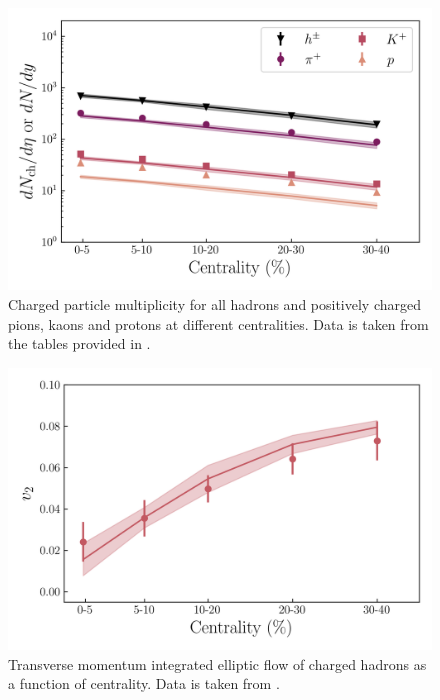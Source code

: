 \begin{figure}[H]
	\includegraphics[width=\textwidth]{images/dn_cent_bulk.png}
	\caption{\normalsize Charged particle multiplicity for all hadrons and positively charged pions, kaons and protons at different centralities. Data is taken from the tables provided in \cite{Abelev:2008ab}. } 
\end{figure}

\begin{figure}[H]
	\includegraphics[width=\textwidth]{images/vn_cent_bulk.png}
	\caption{\normalsize Transverse momentum integrated elliptic flow of charged hadrons as a function of centrality. Data is taken from \cite{Abelev:2008ae}.} 
\end{figure}

